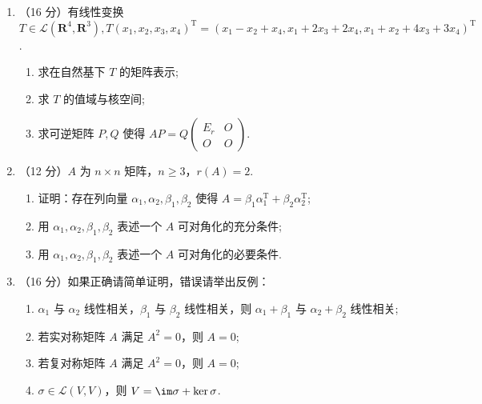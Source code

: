 \begin{enumerate}
    \item （16 分）有线性变换\(T \in \mathcal{L}(\mathbf{R}^4,\mathbf{R}^3), T(x_1,x_2,x_3,x_4)^\mathrm{T}=(x_1-x_2+x_4, x_1+2x_3+2x_4, x_1+x_2+4x_3+3x_4)^\mathrm{T}\).
    \begin{enumerate}
        \item 求在自然基下 \(T\) 的矩阵表示;
        \item 求 \(T\) 的值域与核空间;
        \item 求可逆矩阵 \(P,Q\) 使得
        \(AP=Q\begin{pmatrix}
            E_r & O \\
            O & O
        \end{pmatrix}\).
    \end{enumerate}

    \item （12 分）\(A\) 为 \(n\times n\) 矩阵，\(n\geqslant 3\)，\(r(A)=2\).
    \begin{enumerate}
        \item 证明：存在列向量 \(\alpha_1, \alpha_2, \beta_1, \beta_2\) 使得 \(A=\beta_1\alpha_1^\mathrm{T}+\beta_2\alpha_2^\mathrm{T}\);
        \item 用 \(\alpha_1,\alpha_2,\beta_1,\beta_2\) 表述一个 \(A\) 可对角化的充分条件;
        \item 用 \(\alpha_1,\alpha_2,\beta_1,\beta_2\) 表述一个 \(A\) 可对角化的必要条件.
    \end{enumerate}

    \item （16 分）如果正确请简单证明，错误请举出反例：
    \begin{enumerate}
        \item \(\alpha_1\) 与 \(\alpha_2\) 线性相关，\(\beta_1\) 与 \(\beta_2\) 线性相关，则 \(\alpha_1+\beta_1\) 与 \(\alpha_2+\beta_2\) 线性相关;
        \item 若实对称矩阵 \(A\) 满足 \(A^2=0\)，则 \(A=0\);
        \item 若复对称矩阵 \(A\) 满足 \(A^2=0\)，则 \(A=0\);
        \item \(\sigma\in \mathcal{L}(V,V)\)，则 \(V=\im\sigma+\ker\sigma\).
    \end{enumerate}
\end{enumerate}

\clearpage
